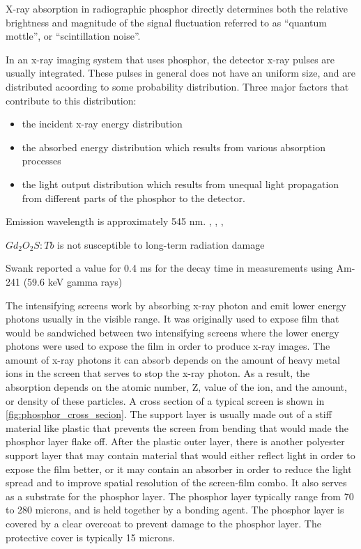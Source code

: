 X-ray absorption in radiographic phosphor directly determines both the relative brightness and magnitude of the signal fluctuation referred to as ``quantum mottle'', or ``scintillation noise''.\cite{swank1973}

In an x-ray imaging system that uses phosphor, the detector x-ray pulses are usually integrated.  These pulses in general does not have an uniform size, and are distributed acoording to some probability distribution.  Three major factors that contribute to this distribution:

\begin{itemize}
\item the incident x-ray energy distribution
\item the absorbed energy distribution which results from various absorption processes
\item the light output distribution which results from unequal light propagation from different parts of the phosphor to the detector.
\end{itemize}


Emission wavelength is approximately 545 nm. \cite{Berzins1983}, \cite{Moy1993}, \cite{shepherd1995}, \cite{blasse1994}

$Gd_2O_2S:Tb$ is not susceptible to long-term radiation damage \cite{Antonuk1990}

Swank reported a value for 0.4 ms for the decay time in measurements using Am-241 (59.6 keV gamma rays) \cite{Swank1974}

The intensifying screens work by absorbing x-ray photon and emit lower energy photons usually in the visible range.  It was originally used to expose film that would be sandwiched between two intensifying screens where the lower energy photons were used to expose the film in order to produce x-ray images.  The amount of x-ray photons it can absorb depends on the amount of heavy metal ions in the screen that serves to stop the x-ray photon.  As a result, the absorption depends on the atomic number, Z, value of the ion, and the amount, or density of these particles.  A cross section of a typical screen is shown in \ref{fig:phosphor_cross_secion}.  The support layer is usually made out of a stiff material like plastic that prevents the screen from bending that would made the phosphor layer flake off.  After the plastic outer layer, there is another polyester support layer that may contain material that would either reflect light in order to expose the film better, or it may contain an absorber in order to reduce the light spread and to improve spatial resolution of the screen-film combo.  It also serves as a substrate for the phosphor layer.    The phosphor layer typically range from 70 to 280 microns, and is held together by a bonding agent.  The phosphor layer is covered by a clear overcoat to prevent damage to the phosphor layer.  The protective cover is typically 15 microns.  \cite{Barrett1981}

